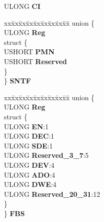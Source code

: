 \begin{DoxyCompactItemize}
\begin{tabbing}
\end{tabbing}\item 
\mbox{\label{struct___i_d_e___a_h_c_i___p_o_r_t___r_e_g_i_s_t_e_r_s_a354561f9793c6dbc96602ac627bab149}} 
U\+L\+O\+NG {\bfseries CI}
\item 
\mbox{\label{struct___i_d_e___a_h_c_i___p_o_r_t___r_e_g_i_s_t_e_r_s_a8ba5a9a0c6f2a512ae17fe09c600b1d4}} 
\begin{tabbing}
xx\=xx\=xx\=xx\=xx\=xx\=xx\=xx\=xx\=\kill
union \{\\
\>ULONG {\bfseries Reg}\\
\mbox{\label{union___i_d_e___a_h_c_i___p_o_r_t___r_e_g_i_s_t_e_r_s_1_1_0D1029_a40a287533c6c49b01bdd2146826ae0dc}} 
\>struct \{\\
\>\>USHORT {\bfseries PMN}\\
\>\>USHORT {\bfseries Reserved}\\
\>\} \\
\} {\bfseries SNTF}\\

\end{tabbing}\item 
\mbox{\label{struct___i_d_e___a_h_c_i___p_o_r_t___r_e_g_i_s_t_e_r_s_aafa517187ff0ee072368be5e5265a7fc}} 
\begin{tabbing}
xx\=xx\=xx\=xx\=xx\=xx\=xx\=xx\=xx\=\kill
union \{\\
\>ULONG {\bfseries Reg}\\
\mbox{\label{union___i_d_e___a_h_c_i___p_o_r_t___r_e_g_i_s_t_e_r_s_1_1_0D1030_a488c654ea48785212bb02adafea89e40}} 
\>struct \{\\
\>\>ULONG {\bfseries EN}:1\\
\>\>ULONG {\bfseries DEC}:1\\
\>\>ULONG {\bfseries SDE}:1\\
\>\>ULONG {\bfseries Reserved\_3\_7}:5\\
\>\>ULONG {\bfseries DEV}:4\\
\>\>ULONG {\bfseries ADO}:4\\
\>\>ULONG {\bfseries DWE}:4\\
\>\>ULONG {\bfseries Reserved\_20\_31}:12\\
\>\} \\
\} {\bfseries FBS}\\


\end{tabbing}
\end{DoxyCompactItemize}
